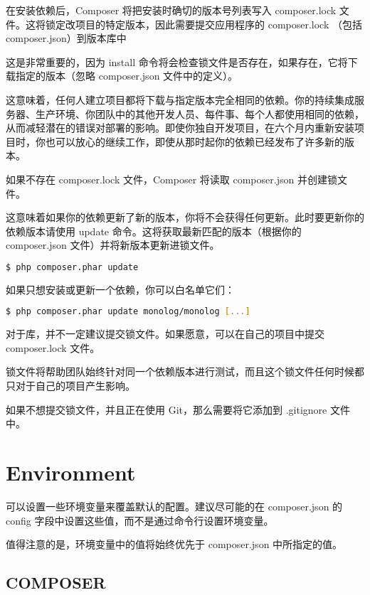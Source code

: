 在安装依赖后，Composer 将把安装时确切的版本号列表写入 composer.lock 文件。这将锁定改项目的特定版本，因此需要提交应用程序的 composer.lock （包括 composer.json）到版本库中

这是非常重要的，因为 install 命令将会检查锁文件是否存在，如果存在，它将下载指定的版本（忽略 composer.json 文件中的定义）。

这意味着，任何人建立项目都将下载与指定版本完全相同的依赖。你的持续集成服务器、生产环境、你团队中的其他开发人员、每件事、每个人都使用相同的依赖，从而减轻潜在的错误对部署的影响。即使你独自开发项目，在六个月内重新安装项目时，你也可以放心的继续工作，即使从那时起你的依赖已经发布了许多新的版本。

如果不存在 composer.lock 文件，Composer 将读取 composer.json 并创建锁文件。

这意味着如果你的依赖更新了新的版本，你将不会获得任何更新。此时要更新你的依赖版本请使用 update 命令。这将获取最新匹配的版本（根据你的 composer.json 文件）并将新版本更新进锁文件。

\begin{lstlisting}[language=bash]
$ php composer.phar update
\end{lstlisting}

如果只想安装或更新一个依赖，你可以白名单它们：

\begin{lstlisting}[language=bash]
$ php composer.phar update monolog/monolog [...]
\end{lstlisting}

对于库，并不一定建议提交锁文件。如果愿意，可以在自己的项目中提交 composer.lock 文件。

锁文件将帮助团队始终针对同一个依赖版本进行测试，而且这个锁文件任何时候都只对于自己的项目产生影响。

如果不想提交锁文件，并且正在使用 Git，那么需要将它添加到 .gitignore 文件中。



\section{Environment}


可以设置一些环境变量来覆盖默认的配置。建议尽可能的在 composer.json 的 config 字段中设置这些值，而不是通过命令行设置环境变量。

值得注意的是，环境变量中的值将始终优先于 composer.json 中所指定的值。

\subsection{COMPOSER}

